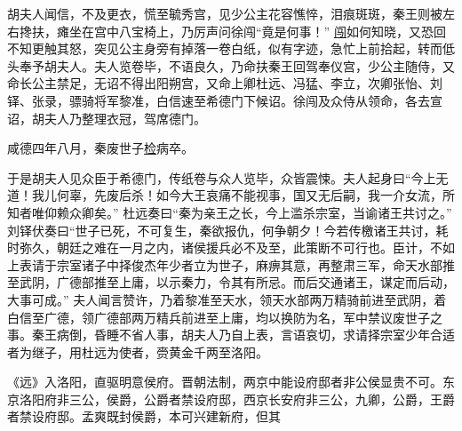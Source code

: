 \documentclass[UTF8]{ctexart}
\begin{document}
胡夫人闻信，不及更衣，慌至毓秀宫，见少公主花容憔悴，泪痕斑斑，秦王则被左右搀扶，瘫坐在宫中八宝椅上，乃厉声问徐闯“竟是何事！” \uline{闯}如何知晓，又恐回不知更触其怒，突见公主身旁有掉落一卷白纸，似有字迹，急忙上前拾起，转而低头奉予胡夫人。夫人览卷毕，不语良久，乃命扶秦王回驾奉仪宫，少公主随侍，又命长公主禁足，无诏不得出阳朔宫，又命上卿杜远、冯猛、李立，次卿张怡、刘铎、张录，骠骑将军黎准，白信速至希德门下候诏。徐闯及众侍从领命，各去宣诏，胡夫人乃整理衣冠，驾席德门。

咸德四年八月，秦废世子\uline{检}病卒。

于是胡夫人见众臣于希德门，传纸卷与众人览毕，众皆震悚。夫人起身曰“今上无道！我儿何辜，先废后杀！如今大王哀痛不能视事，国又无后嗣，我一介女流，所知者唯仰赖众卿矣。” 杜远奏曰“秦为亲王之长，今上滥杀宗室，当谕诸王共讨之。” 刘铎伏奏曰“世子已死，不可复生，秦欲报仇，何争朝夕！今若传檄诸王共讨，耗时弥久，朝廷之难在一月之内，诸侯援兵必不及至，此策断不可行也。臣计，不如上表请于宗室诸子中择俊杰年少者立为世子，麻痹其意，再整肃三军，命天水部推至武阴，广德部推至上庸，以示秦力，令其有所忌。而后交通诸王，谋定而后动，大事可成。” 夫人闻言赞许，乃着黎准至天水，领天水部两万精骑前进至武阴，着白信至广德，领广德部两万精兵前进至上庸，均以换防为名，军中禁议废世子之事。秦王病倒，昏睡不省人事，胡夫人乃自上表，言语哀切，求请择宗室少年合适者为继子，用杜远为使者，赍黄金千两至洛阳。

《远》入洛阳，直驱明意侯府。晋朝法制，两京中能设府邸者非公侯显贵不可。东京洛阳府非三公，侯爵，公爵者禁设府邸，西京长安府非三公，九卿，公爵，王爵者禁设府邸。孟爽既封侯爵，本可兴建新府，但其
\end{document}
